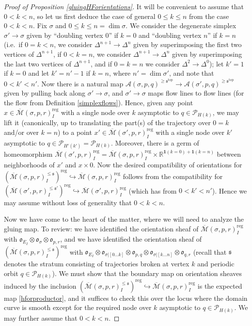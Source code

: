 \documentclass[12pt]{article}
\theoremstyle{definition}
\theoremstyle{remark}
\numberwithin{equation}{subsection}
\newcommand{\s}{\mathfrak s}
\newcommand{\oo}{\mathfrak o}
\newcommand{\RR}{\mathbb R}
\newcommand{\PPP}{\mathcal P}
\newcommand{\ttop}{\mathrm{top}}
\newcommand{\A}{\mathcal A}
\newcommand{\Mbar}{\overline{\mathcal M}}
\newcommand{\reg}{\mathrm{reg}}
\begin{document}
\begin{proof}[Proof of Proposition \ref{gluingHForientations}]
It will be convenient to assume that $0<k<n$, so let us first deduce the case of general $0\leq k\leq n$ from the case $0<k<n$.  Fix $\sigma$ and $0\leq k\leq n=\dim\sigma$.  We consider the degenerate simplex $\sigma'\to\sigma$ given by ``doubling vertex $0$'' if $k=0$ and ``doubling vertex $n$'' if $k=n$ (i.e.\ if $0=k<n$, we consider $\Delta^{n+1}\to\Delta^n$ given by superimposing the first two vertices of $\Delta^{n+1}$, if $0<k=n$, we consider $\Delta^{n+1}\to\Delta^n$ given by superimposing the last two vertices of $\Delta^{n+1}$, and if $0=k=n$ we consider $\Delta^2\to\Delta^0$); let $k'=1$ if $k=0$ and let $k'=n'-1$ if $k=n$, where $n'=\dim\sigma'$, and note that $0<k'<n'$.  Now there is a natural map $\A(\sigma,p,q)^{\geq\s^\ttop}\to\A(\sigma',p,q)^{\geq\s^\ttop}$ given by pulling back along $\sigma'\to\sigma$, and $\sigma'\to\sigma$ maps flow lines to flow lines (for the flow from Definition \ref{simplexflows}).  Hence, given any point $x\in\Mbar(\sigma,p,r)_I^\reg$ with a single node over $k$ asymptotic to $q\in\PPP_{H(k)}$, we may lift it (canonically, up to translating the part(s) of the trajectory over $0=k$ and/or over $k=n$) to a point $x'\in\Mbar(\sigma',p,r)_I^\reg$ with a single node over $k'$ asymptotic to $q\in\PPP_{H'(k')}=\PPP_{H(k)}$.  Moreover, there is a germ of homeomorphism $\Mbar(\sigma',p,r)_I^\reg=\Mbar(\sigma,p,r)_I^\reg\times\RR^{\mathbf 1(k=0)+\mathbf 1(k=n)}$ between neighborhoods of $x'$ and $x\times 0$.  Now the desired compatibility of orientations for $(\Mbar(\sigma,p,r)_I^{\leq\s})^\reg\hookrightarrow\Mbar(\sigma,p,r)_I^\reg$ follows from the compatibility for $(\Mbar(\sigma',p,r)_I^{\leq\s'})^\reg\hookrightarrow\Mbar(\sigma',p,r)_I^\reg$ (which has from $0<k'<n'$).  Hence we may assume without loss of generality that $0<k<n$.

Now we have come to the heart of the matter, where we will need to analyze the gluing map.  To review: we have identified the orientation sheaf of $\Mbar(\sigma,p,r)_I^\reg$ with $\oo_{E_I}\otimes\oo_\sigma\otimes\oo_{p,r}$, and we have identified the orientation sheaf of $(\Mbar(\sigma,p,r)^{\leq\s}_I)^\reg$  with $\oo_{E_I}\otimes\oo_{\sigma|[0\ldots k]}\otimes\oo_{p,q}\otimes\oo_{\sigma|[k\ldots n]}\otimes\oo_{q,r}$ (recall that $\s$ denotes the stratum consisting of trajectories broken at vertex $k$ and periodic orbit $q\in\PPP_{H(k)}$).  We must show that the boundary map on orientation sheaves induced by the inclusion $(\Mbar(\sigma,p,r)^{\leq\s}_I)^\reg\hookrightarrow\Mbar(\sigma,p,r)_I^\reg$ is the expected map \eqref{hforproductor}, and it suffices to check this over the locus where the domain curve is smooth except for the required node over $k$ asymptotic to $q\in\PPP_{H(k)}$.  We may further assume that $0<k<n$.


\end{proof}
\end{document}
